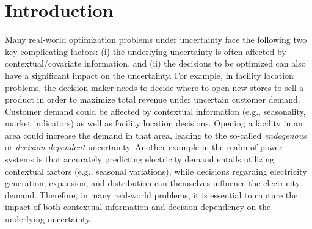 \documentclass[onefignum,onetabnum]{siamart251216}
\newcounter{example}
\begin{document}
\section{Introduction}


Many real-world optimization problems under uncertainty face the following two key complicating factors: (i) the underlying uncertainty is often affected by contextual/covariate information, and (ii) the decisions to be optimized can also have a significant impact on the uncertainty.
For example, in facility location problems, the decision maker needs to decide where to open new stores to sell a product in order to maximize total revenue under uncertain customer demand. Customer demand could be affected by contextual information (e.g., seasonality, market indicators) as well as facility location decisions.
Opening a facility in an area could increase the demand in that area, leading to the so-called \textit{endogenous} or \textit{decision-dependent} uncertainty. 
Another example in the realm of power systems is that accurately predicting electricity demand entails utilizing contextual factors (e.g., seasonal variations), while decisions regarding electricity generation, expansion, and distribution can themselves influence the electricity demand.  Therefore, in many real-world problems, it is essential to capture the impact of both contextual information and decision dependency on the underlying uncertainty. 
\end{document}
